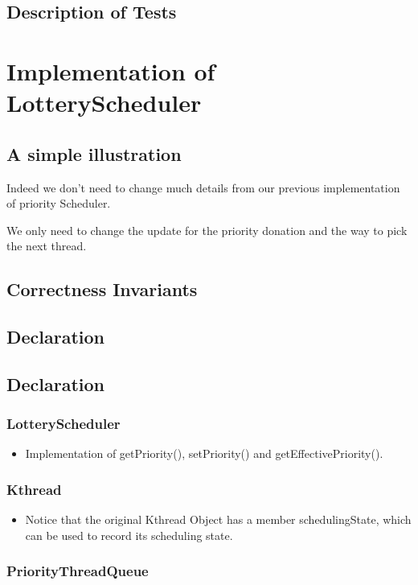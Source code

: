 \documentclass{article}
\begin{document}
	\subsection{Description of Tests}
	\section{Implementation of LotteryScheduler}
	\subsection{A simple illustration}
	Indeed we don't need to change much details from our previous implementation of priority Scheduler.
	
	We only need to change the update for the priority donation and the way to pick the next thread.
	\subsection{Correctness Invariants}
	\subsection{Declaration}
	
	\subsection{Declaration}
	\subsubsection{LotteryScheduler}
	
	\begin{itemize}
		\item Implementation of getPriority(), setPriority() and getEffectivePriority().
	\end{itemize}
	
	\subsubsection{Kthread}
	
	\begin{itemize}
		\item Notice that the original Kthread Object has a member schedulingState, which can be used to record its scheduling state.
	\end{itemize}
	\subsubsection{PriorityThreadQueue}
	
\end{document}
